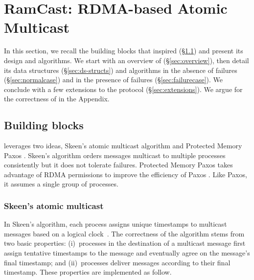 
\section{RamCast: RDMA-based Atomic Multicast}
\label{sec:rdma-atomic-multicast}

In this section, we recall the building blocks that inspired \libname (\S\ref{sec:bblocks}) and present its design and algorithms. 
We start with an overview of \libname (\S\ref{sec:overview}), then detail its data structures (\S\ref{sec:ds-structs}) and algorithms in the absence of failures (\S\ref{sec:normalcase}) and in the presence of failures (\S\ref{sec:failurecase}).
We conclude with a few extensions to the protocol (\S\ref{sec:extensions}).
We argue for the correctness of \libname in the Appendix.

\subsection{Building blocks}
\label{sec:bblocks}

\libname leverages two ideas, Skeen's atomic multicast algorithm \cite{BJ87b} and Protected Memory Paxos \cite{Aguilera2019}.
Skeen's algorithm orders messages multicast to multiple processes consistently but it does not tolerate failures.
Protected Memory Paxos takes advantage of RDMA permissions to improve the efficiency of Paxos \cite{L98}. 
Like Paxos, it assumes a single group of processes.


\subsubsection{Skeen's atomic multicast}

In Skeen's algorithm, each process assigns unique timestamps to multicast messages based on a logical clock~\cite{Lam78}.
The correctness of the algorithm stems from two basic properties:
(i)~processes in the destination of a multicast message first assign tentative timestamps to the message and eventually agree on the message's final timestamp; and
(ii)~processes deliver messages according to their final timestamp.
These properties are implemented as follow.

